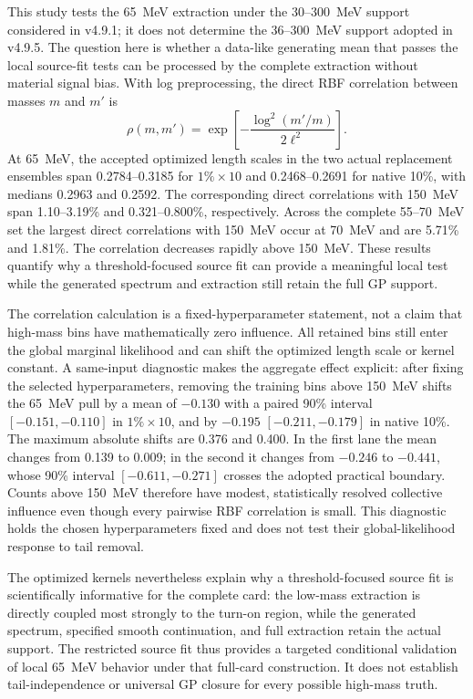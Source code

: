 This study tests the 65~MeV extraction under the 30--300~MeV support considered in
v4.9.1; it does not determine the 36--300~MeV support adopted in v4.9.5.  The question
here is whether a data-like generating mean that passes the local
source-fit tests can be processed by the complete extraction without material signal
bias.  With log preprocessing, the direct RBF correlation between masses $m$ and
$m'$ is
\begin{equation}
 \rho(m,m')=\exp\!\left[-\frac{\log^2(m'/m)}{2\ell^2}\right].
\end{equation}
At 65~MeV, the accepted optimized length scales in the two actual replacement
ensembles span 0.2784--0.3185 for $1\%\times10$ and 0.2468--0.2691 for native
10\%, with medians 0.2963 and 0.2592.  The corresponding direct correlations with
150~MeV span 1.10--3.19\% and 0.321--0.800\%, respectively.  Across the complete
55--70~MeV set the largest direct correlations with 150~MeV occur at 70~MeV and are
5.71\% and 1.81\%.  The correlation decreases rapidly above 150~MeV.  These results quantify why a
threshold-focused source fit can provide a meaningful local test while the generated
spectrum and extraction still retain the full GP support.

The correlation calculation is a fixed-hyperparameter statement, not a claim that
high-mass bins have mathematically zero influence.  All retained bins still enter the
global marginal likelihood and can shift the optimized length scale or kernel
constant.  A same-input diagnostic makes the aggregate effect explicit: after fixing
the selected hyperparameters, removing the training bins above 150~MeV shifts the
65~MeV pull by a mean of $-0.130$ with a paired 90\% interval
$[-0.151,-0.110]$ in $1\%\times10$, and by $-0.195$
$[-0.211,-0.179]$ in native 10\%.  The maximum absolute shifts are 0.376 and
0.400.  In the first lane the mean changes from 0.139 to 0.009; in the second it
changes from $-0.246$ to $-0.441$, whose 90\% interval
$[-0.611,-0.271]$ crosses the adopted practical boundary.  Counts above 150~MeV
therefore have modest, statistically resolved collective influence even though every
pairwise RBF correlation is small.  This diagnostic holds the chosen hyperparameters
fixed and does not test their global-likelihood response to tail removal.

The optimized kernels nevertheless explain why a threshold-focused source fit is
scientifically informative for the complete card: the low-mass extraction is
directly coupled most strongly to the turn-on region, while the generated spectrum,
specified smooth continuation, and full extraction retain the actual support.  The
restricted source fit thus provides a targeted conditional validation of local
65~MeV behavior under that full-card construction.  It does not establish
tail-independence or universal GP closure for every possible high-mass truth.

